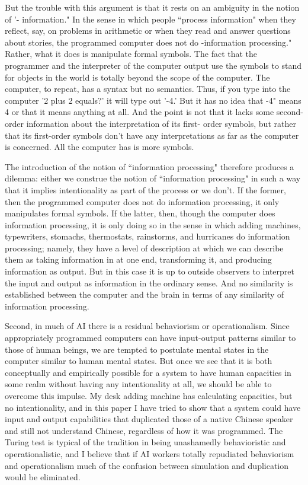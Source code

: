 But the trouble with this argument is that it rests on an ambiguity in the notion of '- information." In the sense in
which people ``process information" when they reflect, say, on problems in arithmetic or when they read and
answer questions about stories, the programmed computer does not do -information processing." Rather, what
it does is manipulate formal symbols. The fact that the programmer and the interpreter of the computer output
use the symbols to stand for objects in the world is totally beyond the scope of the computer. The computer, to
repeat, has a syntax but no semantics. Thus, if you type into the computer '2 plus 2 equals?' it will type out '-4.'
But it has no idea that -4" means 4 or that it means anything at all. And the point is not that it lacks some
second-order information about the interpretation of its first- order symbols, but rather that its first-order
symbols don't have any interpretations as far as the computer is concerned. All the computer has is more
symbols.

The introduction of the notion of ``information processing" therefore produces a dilemma: either we construe the
notion of ``information processing" in such a way that it implies intentionality as part of the process or we don't. If
the former, then the programmed computer does not do information processing, it only manipulates formal
symbols. If the latter, then, though the computer does information processing, it is only doing so in the sense in
which adding machines, typewriters, stomachs, thermostats, rainstorms, and hurricanes do information
processing; namely, they have a level of description at which we can describe them as taking information in at
one end, transforming it, and producing information as output. But in this case it is up to outside observers to
interpret the input and output as information in the ordinary sense. And no similarity is established between the
computer and the brain in terms of any similarity of information processing.

Second, in much of AI there is a residual behaviorism or operationalism. Since appropriately programmed
computers can have input-output patterns similar to those of human beings, we are tempted to postulate mental
states in the computer similar to human mental states. But once we see that it is both conceptually and
empirically possible for a system to have human capacities in some realm without having any intentionality at all,
we should be able to overcome this impulse. My desk adding machine has calculating capacities, but no
intentionality, and in this paper I have tried to show that a system could have input and output capabilities that
duplicated those of a native Chinese speaker and still not understand Chinese, regardless of how it was
programmed. The Turing test is typical of the tradition in being unashamedly behavioristic and operationalistic,
and I believe that if AI workers totally repudiated behaviorism and operationalism much of the confusion
between simulation and duplication would be eliminated.

